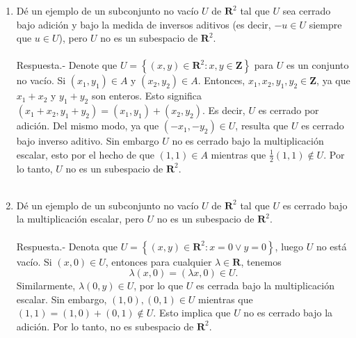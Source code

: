 \begin{enumerate}[\bfseries 1.]
\begin{enumerate}[(a)]
	\end{enumerate}

    \item Dé un ejemplo de un subconjunto no vacío $U$ de $\textbf{R}^2$ tal que $U$ sea cerrado bajo adición y bajo la medida de inversos aditivos (es decir, $-u\in U$ siempre que $u \in U$), pero $U$ no es un subespacio de $\textbf{R}^2$.\\\\
	Respuesta.-\; Denote que $U=\left\{(x,y)\in \textbf{R}^2 : x,y\in \textbf{Z}\right\}$ para $U$ es un conjunto no vacío. Si $(x_1,y_1)\in A$ y $(x_2,y_2)\in A$. Entonces, $x_1,x_2,y_1,y_2\in \textbf{Z}$, ya que $x_1+x_2$ y $y_1+y_2$ son enteros. Esto significa $(x_1+x_2,y_1+y_2)=(x_1,y_1)+(x_2,y_2)$. Es decir, $U$ es cerrado por adición. Del mismo modo, ya que $(-x_1,-y_2)\in U$, resulta que $U$ es cerrado bajo inverso aditivo. Sin embargo $U$ no es cerrado bajo la multiplicación escalar, esto por el hecho de que $(1,1)\in A$ mientras que $\frac{1}{2}(1,1)\notin U.$ Por lo tanto, $U$ no es un subespacio de $\textbf{R}^2$.\\\\

    \item Dé un ejemplo de un subconjunto no vacío $U$ de $\textbf{R}^2$ tal que $U$ es cerrado bajo la multiplicación escalar, pero $U$ no es un subespacio de $\textbf{R}^2$.\\\\
	Respuesta.-\; Denota que $U=\left\{(x,y)\in \textbf{R}^2 : x=0 \lor y=0\right\}$, luego $U$ no está vacío. Si $(x,0)\in U$, entonces para cualquier $\lambda \in \textbf{R}$, tenemos
	$$\lambda(x,0)=(\lambda x, 0)\in U.$$
	Similarmente, $\lambda(0,y)\in U$, por lo que $U$ es cerrada bajo la multiplicación escalar. Sin embargo,  $(1,0),(0,1)\in U$ mientras que $(1,1)=(1,0)+(0,1)\notin U.$ Esto implica que $U$ no es cerrado bajo la adición. Por lo tanto, no es subespacio de $\textbf{R}^2$.\\\\


\end{enumerate}
